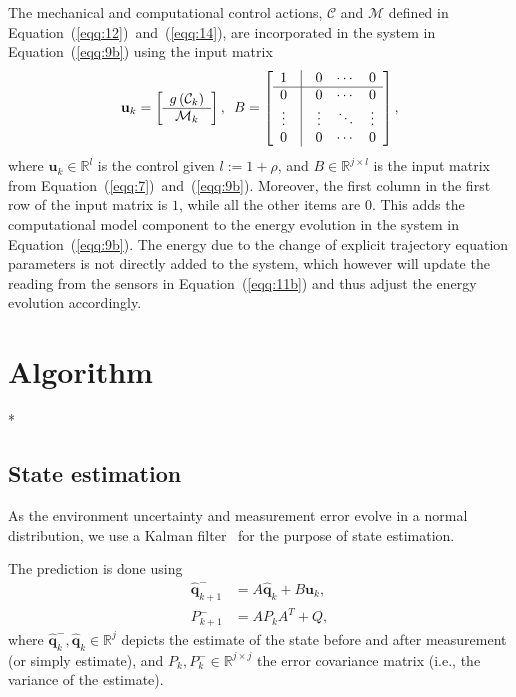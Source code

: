 \documentclass[letterpaper,10pt,conference]{ieeeconf}
\begin{document}
The mechanical and computational control actions, $\mathcal{C}$ and $\mathcal{M}$ defined in Equation~(\ref{eqq:12})~and~(\ref{eqq:14}), are incorporated in the system in Equation~(\ref{eqq:9b}) using the input matrix
\begin{equation}
  \mathbf{u}_k=\left[\begin{array}{c}
    g\left(\mathcal{C}_k\right) \\\hline \mathcal{M}_k
  \end{array}\right],\,\,\,
  B=\left[\begin{array}{ccccccc}
    1 & \vline & 0 & \cdots & 0\\\hline
    0 & \vline & 0 & \cdots & 0\\
    \vdots & \vline & \vdots & \ddots & \vdots\\
    0 & \vline & 0 & \cdots & 0
  \end{array}\right],
\end{equation}
where $\mathbf{u}_k\in\mathbb{R}^l$ is the control given $l:=1+\rho$, and $B\in\mathbb{R}^{j\times l}$ is the input matrix from Equation~(\ref{eqq:7})~and~(\ref{eqq:9b}). Moreover, the first column in the first row of the input matrix is $1$, while all the other items are $0$. This adds the computational model component to the energy evolution in the system in Equation~(\ref{eqq:9b}). The energy due to the change of explicit trajectory equation parameters is not directly added to the system, which however will update the reading from the sensors in Equation~(\ref{eqq:11b}) and thus adjust the energy evolution accordingly.

\section{Algorithm}

*

\subsection{State estimation}

As the environment uncertainty and measurement error evolve in a normal distribution, we use a Kalman filter~\cite{stengel1994optimal, simon2006optimal} for the purpose of state estimation. 

The prediction is done using
\begin{subequations}\label{eqq:10}\begin{align}
  \hat{\mathbf{q}}_{k+1}^-&=A\hat{\mathbf{q}}_{k}+B\mathbf{u}_k,\label{eqq:10a}\\
  P_{k+1}^-&=AP_kA^T+Q,\label{eqq:10b}
\end{align}\end{subequations}
where $\hat{\mathbf{q}}_k^-,\hat{\mathbf{q}}_k\in\mathbb{R}^j$ depicts the estimate of the state before and after measurement (or simply estimate), and $P_k,P_k^-\in\mathbb{R}^{j\times j}$ the error covariance matrix (i.e., the variance of the estimate). 
\end{document}

